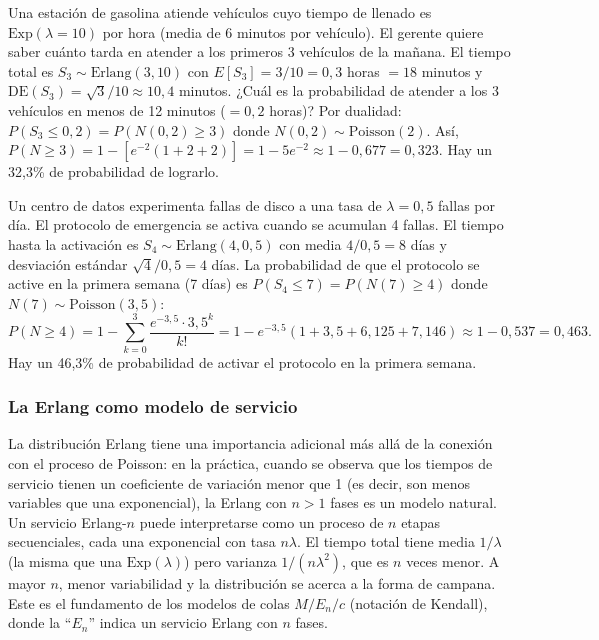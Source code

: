 \documentclass[11pt, letterpaper]{article}
\begin{document}
\begin{ejemplo}
Una estación de gasolina atiende vehículos cuyo tiempo de llenado es $\text{Exp}(\lambda = 10)$ por hora (media de 6 minutos por vehículo). El gerente quiere saber cuánto tarda en atender a los primeros 3 vehículos de la mañana. El tiempo total es $S_3 \sim \text{Erlang}(3, 10)$ con $E[S_3] = 3/10 = 0{,}3$ horas $= 18$ minutos y $\text{DE}(S_3) = \sqrt{3}/10 \approx 10{,}4$ minutos. ¿Cuál es la probabilidad de atender a los 3 vehículos en menos de 12 minutos ($= 0{,}2$ horas)? Por dualidad: $P(S_3 \leq 0{,}2) = P(N(0{,}2) \geq 3)$ donde $N(0{,}2) \sim \text{Poisson}(2)$. Así, $P(N \geq 3) = 1 - [e^{-2}(1 + 2 + 2)] = 1 - 5e^{-2} \approx 1 - 0{,}677 = 0{,}323$. Hay un 32{,}3\% de probabilidad de lograrlo.
\end{ejemplo}

\begin{ejemplo}
Un centro de datos experimenta fallas de disco a una tasa de $\lambda = 0{,}5$ fallas por día. El protocolo de emergencia se activa cuando se acumulan 4 fallas. El tiempo hasta la activación es $S_4 \sim \text{Erlang}(4, 0{,}5)$ con media $4/0{,}5 = 8$ días y desviación estándar $\sqrt{4}/0{,}5 = 4$ días. La probabilidad de que el protocolo se active en la primera semana (7 días) es $P(S_4 \leq 7) = P(N(7) \geq 4)$ donde $N(7) \sim \text{Poisson}(3{,}5)$:
\[
P(N \geq 4) = 1 - \sum_{k=0}^{3} \frac{e^{-3{,}5}\cdot 3{,}5^k}{k!} = 1 - e^{-3{,}5}\left(1 + 3{,}5 + 6{,}125 + 7{,}146\right) \approx 1 - 0{,}537 = 0{,}463.
\]
Hay un 46{,}3\% de probabilidad de activar el protocolo en la primera semana.
\end{ejemplo}

\subsubsection*{La Erlang como modelo de servicio}

La distribución Erlang tiene una importancia adicional más allá de la conexión con el proceso de Poisson: en la práctica, cuando se observa que los tiempos de servicio tienen un coeficiente de variación menor que 1 (es decir, son menos variables que una exponencial), la Erlang con $n > 1$ fases es un modelo natural. Un servicio Erlang-$n$ puede interpretarse como un proceso de $n$ etapas secuenciales, cada una exponencial con tasa $n\lambda$. El tiempo total tiene media $1/\lambda$ (la misma que una $\text{Exp}(\lambda)$) pero varianza $1/(n\lambda^2)$, que es $n$ veces menor. A mayor $n$, menor variabilidad y la distribución se acerca a la forma de campana. Este es el fundamento de los modelos de colas $M/E_n/c$ (notación de Kendall), donde la ``$E_n$'' indica un servicio Erlang con $n$ fases.
\end{document}
